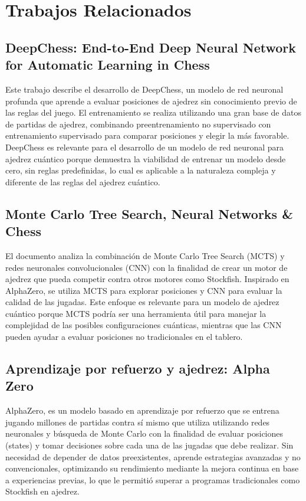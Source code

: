 \section{Trabajos Relacionados}
\subsection{DeepChess: End-to-End Deep Neural Network for Automatic Learning in Chess}

Este trabajo describe el desarrollo de DeepChess, un modelo de red neuronal profunda que aprende a evaluar posiciones de ajedrez sin conocimiento previo de las reglas del juego. El entrenamiento se realiza utilizando una gran base de datos de partidas de ajedrez, combinando preentrenamiento no supervisado con entrenamiento supervisado para comparar posiciones y elegir la más favorable. DeepChess es relevante para el desarrollo de un modelo de red neuronal para ajedrez cuántico porque demuestra la viabilidad de entrenar un modelo desde cero, sin reglas predefinidas, lo cual es aplicable a la naturaleza compleja y diferente de las reglas del ajedrez cuántico.\cite{David201688}

\subsection{Monte Carlo Tree Search, Neural Networks \& Chess}

El documento analiza la combinación de Monte Carlo Tree Search (MCTS) y redes neuronales convolucionales (CNN) con la finalidad de crear un motor de ajedrez que pueda competir contra otros motores como Stockfish. Inspirado en AlphaZero, se utiliza MCTS para
explorar posiciones y CNN para evaluar la calidad de las jugadas. Este enfoque es relevante para un modelo de ajedrez cuántico porque MCTS podría ser una herramienta útil para manejar la complejidad de las posibles configuraciones cuánticas, mientras que las CNN pueden ayudar a evaluar posiciones no tradicionales en el tablero.\cite{steinberg2021}

\subsection{Aprendizaje por refuerzo y ajedrez: Alpha Zero}

AlphaZero, es un modelo basado en aprendizaje por refuerzo que se entrena jugando millones de partidas contra sí mismo que utiliza utilizando redes neuronales y búsqueda de Monte Carlo con la finalidad de evaluar posiciones (states) y tomar decisiones sobre cada una de las jugadas que debe realizar. Sin necesidad de depender de datos preexistentes, aprende estrategias avanzadas y no convencionales, optimizando su rendimiento mediante la mejora continua en base a experiencias previas, lo que le permitió superar a programas tradicionales como Stockfish en ajedrez.\cite{solana2022}